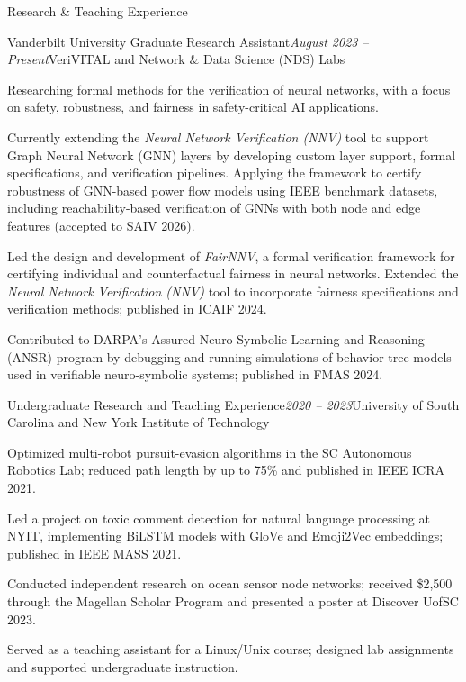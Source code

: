 \documentclass{resume}
\begin{document}
\begin{rSection}{Research \& Teaching Experience}
\begin{rSubsection}{Vanderbilt University Graduate Research Assistant}{\em August 2023 -- Present}{VeriVITAL and Network \& Data Science (NDS) Labs}{}
\item Researching formal methods for the verification of neural networks, with a focus on safety, robustness, and fairness in safety-critical AI applications.
\item Currently extending the \textit{Neural Network Verification (NNV)} tool to support Graph Neural Network (GNN) layers by developing custom layer support, formal specifications, and verification pipelines. Applying the framework to certify robustness of GNN-based power flow models using IEEE benchmark datasets, including reachability-based verification of GNNs with both node and edge features (accepted to SAIV 2026).
\item Led the design and development of \textit{FairNNV}, a formal verification framework for certifying individual and counterfactual fairness in neural networks. Extended the \textit{Neural Network Verification (NNV)} tool to incorporate fairness specifications and verification methods; published in ICAIF 2024.
\item Contributed to DARPA’s Assured Neuro Symbolic Learning and Reasoning (ANSR) program by debugging and running simulations of behavior tree models used in verifiable neuro-symbolic systems; published in FMAS 2024.
\end{rSubsection}

\begin{rSubsection}{Undergraduate Research and Teaching Experience}{\em 2020 -- 2023}{University of South Carolina and New York Institute of Technology}{}
\item Optimized multi-robot pursuit-evasion algorithms in the SC Autonomous Robotics Lab; reduced path length by up to 75\% and published in IEEE ICRA 2021.
\item Led a project on toxic comment detection for natural language processing at NYIT, implementing BiLSTM models with GloVe and Emoji2Vec embeddings; published in IEEE MASS 2021.
\item Conducted independent research on ocean sensor node networks; received \$2,500 through the Magellan Scholar Program and presented a poster at Discover UofSC 2023.
\item Served as a teaching assistant for a Linux/Unix course; designed lab assignments and supported undergraduate instruction.
\end{rSubsection}


\end{rSection}
\end{document}
